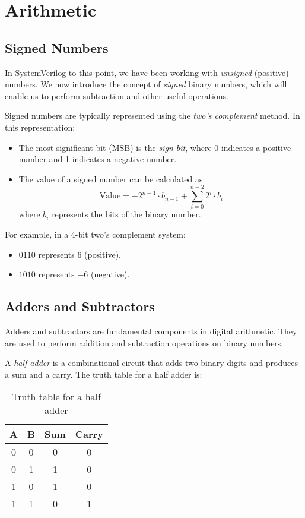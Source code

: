 \section{Arithmetic}

\subsection{Signed Numbers}
In SystemVerilog to this point, we have been working with \emph{unsigned}
(positive) numbers. We now introduce the concept of \emph{signed} binary
numbers, which will enable us to perform subtraction and other useful
operations.

Signed numbers are typically represented using the
\emph{two's complement} method. In this representation:
\begin{itemize}
    \item The most significant bit (MSB) is the \emph{sign bit},
          where 0 indicates a positive number and 1 indicates a negative
          number.
    \item The value of a signed number can be calculated as:
          \[
              \text{Value} = -2^{n-1} \cdot b_{n-1} + \sum_{i=0}^{n-2} 2^i \cdot b_i
          \]
          where $b_i$ represents the bits of the binary number.
\end{itemize}

For example, in a 4-bit two's complement system:
\begin{itemize}
    \item $0110$ represents $6$ (positive).
    \item $1010$ represents $-6$ (negative).
\end{itemize}

\subsection{Adders and Subtractors}
Adders and subtractors are fundamental components in digital
arithmetic. They are used to perform addition and subtraction
operations on binary numbers.

A \emph{half adder} is a combinational circuit that adds two
binary digits and produces a sum and a carry. The truth table
for a half adder is:

\begin{table}[h]
    \centering
    \begin{tabular}{|c|c|c|c|}
        \hline
        \textbf{A} & \textbf{B} & \textbf{Sum} & \textbf{Carry} \\
        \hline
        0          & 0          & 0            & 0              \\
        0          & 1          & 1            & 0              \\
        1          & 0          & 1            & 0              \\
        1          & 1          & 0            & 1              \\
        \hline
    \end{tabular}
    \caption{Truth table for a half adder}
\end{table}

